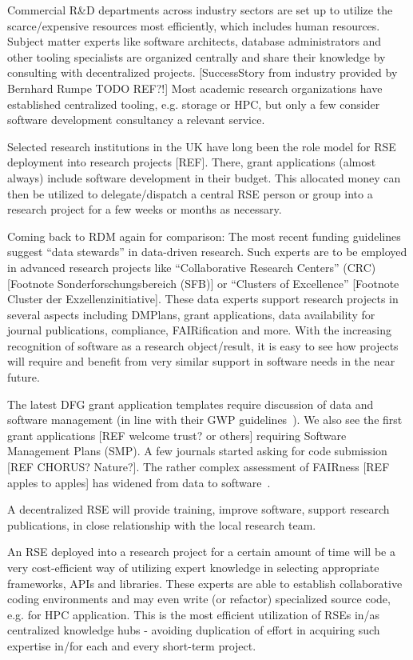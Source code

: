 \documentclass{article}
\begin{document}
Commercial R\&D departments across industry sectors are set up to utilize the scarce/expensive resources most efficiently, which includes human resources.
Subject matter experts like software architects, database administrators and other tooling specialists are organized centrally and share their knowledge by consulting with decentralized projects.
[SuccessStory from industry provided by Bernhard Rumpe TODO REF?!]
Most academic research organizations have established centralized tooling, e.g. storage or HPC, but only a few consider software development consultancy a relevant service. 

Selected research institutions in the UK have long been the role model for RSE deployment into research projects [REF].
There, grant applications (almost always) include software development in their budget.
This allocated money can then be utilized to delegate/dispatch a central RSE person or group into a research project for a few weeks or months as necessary.

Coming back to RDM again for comparison: The most recent funding guidelines suggest  “data stewards” in data-driven research.
Such experts are to be employed in advanced research projects like “Collaborative Research Centers” (CRC)[Footnote Sonderforschungsbereich (SFB)] or “Clusters of Excellence” [Footnote Cluster der Exzellenzinitiative].
These data experts support research projects in several aspects including DMPlans, grant applications, data availability for journal publications, compliance, FAIRification and more.
With the increasing recognition of software as a research object/result, it is easy to see how projects will require and benefit from very similar support in software needs in the near future.

The latest DFG grant application templates require discussion of data and software management (in line with their GWP guidelines~\autocite{dfg_gsp}).
We also see the first grant applications [REF welcome trust? or others] requiring Software Management Plans (SMP).
A few journals started asking for code submission [REF CHORUS? Nature?].
The rather complex assessment of FAIRness [REF apples to apples] has widened from data to software~\autocite{fair_data_maturity_model_working_group_2020}.

A decentralized RSE will provide training, improve software, support research publications, in close relationship with the local research team.

An RSE deployed into a research project for a certain amount of time will be a very cost-efficient way of utilizing expert knowledge in selecting appropriate frameworks, APIs and libraries.
These experts are able to establish collaborative coding environments and may even write (or refactor) specialized source code, e.g. for HPC application.
This is the most efficient utilization of RSEs in/as centralized knowledge hubs - avoiding duplication of effort in acquiring such expertise in/for each and every short-term project.
\end{document}
